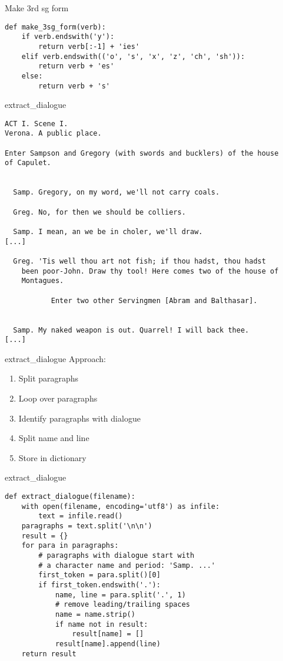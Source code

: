 \documentclass[aspectratio=169,usenames,dvipsnames]{beamer}
\begin{document}
\begin{frame}[fragile]{Make 3rd sg form}
\begin{lstlisting}
def make_3sg_form(verb):
    if verb.endswith('y'):
        return verb[:-1] + 'ies'
    elif verb.endswith(('o', 's', 'x', 'z', 'ch', 'sh')):
        return verb + 'es'
    else:
        return verb + 's'
\end{lstlisting}
\end{frame}


\begin{frame}[fragile]{extract\_dialogue}
\scriptsize
\begin{verbatim}
ACT I. Scene I.
Verona. A public place.

Enter Sampson and Gregory (with swords and bucklers) of the house
of Capulet.


  Samp. Gregory, on my word, we'll not carry coals.

  Greg. No, for then we should be colliers.

  Samp. I mean, an we be in choler, we'll draw.
[...]

  Greg. 'Tis well thou art not fish; if thou hadst, thou hadst
    been poor-John. Draw thy tool! Here comes two of the house of
    Montagues.

           Enter two other Servingmen [Abram and Balthasar].


  Samp. My naked weapon is out. Quarrel! I will back thee.
[...]
\end{verbatim}
\end{frame}

\begin{frame}[fragile]{extract\_dialogue}
    Approach:
    \begin{enumerate}
        \item Split paragraphs
        \item Loop over paragraphs
        \item Identify paragraphs with dialogue
        \item Split name and line
        \item Store in dictionary
    \end{enumerate}
\end{frame}

\begin{frame}[fragile]{extract\_dialogue}
\begin{lstlisting}
def extract_dialogue(filename):
    with open(filename, encoding='utf8') as infile:
        text = infile.read()
    paragraphs = text.split('\n\n')
    result = {}
    for para in paragraphs:
        # paragraphs with dialogue start with
        # a character name and period: 'Samp. ...'
        first_token = para.split()[0]
        if first_token.endswith('.'):
            name, line = para.split('.', 1)
            # remove leading/trailing spaces
            name = name.strip()
            if name not in result:
                result[name] = []
            result[name].append(line)
    return result
\end{lstlisting}
\end{frame}
\end{document}
